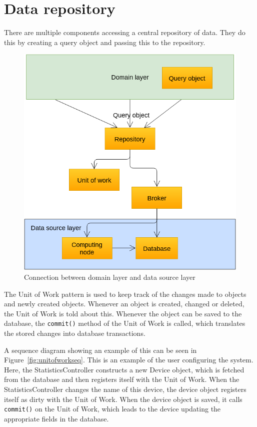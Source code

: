 \clearpage
\section{Data repository}

There are multiple components accessing a central repository of data. They do this by creating a query object and passing this to the repository. 

\begin{figure}[H]
\centering
\includegraphics[width=0.6\linewidth]{7-software/images/RepoUowBroker.png}
\caption{Connection between domain layer and data source layer}
\label{fig:frontclasses}
\end{figure}


The Unit of Work pattern is used to keep track of the changes made to objects and newly created objects. Whenever an object is created, changed or deleted, the Unit of Work is told about this. 
Whenever the object can be saved to the database, the \verb|commit()| method of the Unit of Work is called, which translates the stored changes into database transactions.

A sequence diagram showing an example of this can be seen in Figure~\ref{fig:unitofworkseq}. 
This is an example of the user configuring the system. Here, the StatisticsController constructs a new Device object, which is fetched from the database and then registers itself with the Unit of Work. When the StatisticsController changes the name of this device, the device object registers itself as dirty with the Unit of Work. 
When the device object is saved, it calls \verb|commit()| on the Unit of Work, which leads to the device updating the appropriate fields in the database.

